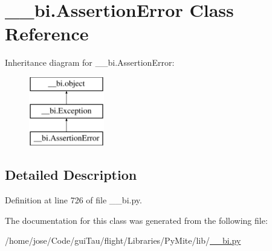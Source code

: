\hypertarget{class____bi_1_1_assertion_error}{\section{\-\_\-\-\_\-bi.\-Assertion\-Error Class Reference}
\label{class____bi_1_1_assertion_error}
}
Inheritance diagram for \-\_\-\-\_\-bi.\-Assertion\-Error\-:\begin{figure}[H]
\begin{center}
\leavevmode
\includegraphics[height=3.000000cm]{class____bi_1_1_assertion_error}
\end{center}
\end{figure}


\subsection{Detailed Description}


Definition at line 726 of file \-\_\-\-\_\-bi.\-py.



The documentation for this class was generated from the following file\-:\begin{DoxyCompactItemize}
\item 
/home/jose/\-Code/gui\-Tau/flight/\-Libraries/\-Py\-Mite/lib/\hyperlink{____bi_8py}{\-\_\-\-\_\-bi.\-py}\end{DoxyCompactItemize}
